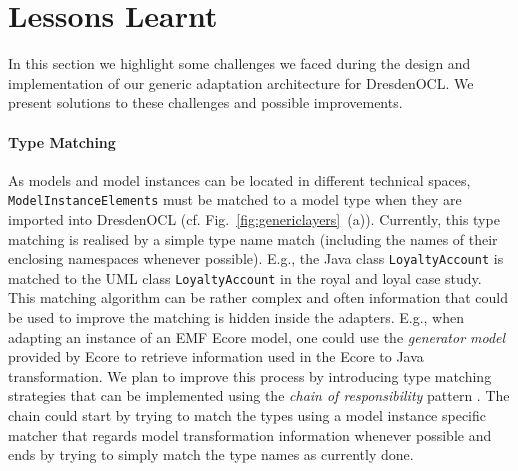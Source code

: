\section{Lessons Learnt}
\label{sec:lessons}

  In this section we highlight some challenges we faced during the design
  and implementation of our generic adaptation architecture for DresdenOCL.
  We present solutions to these challenges and possible improvements.

	\paragraph{Type Matching}
	As models and model instances can be located in different technical spaces,
  \texttt{Model\-Instance\-Elements} must be matched to a model type
	when they are imported into DresdenOCL (cf. Fig.~\ref{fig:genericlayers}~(a)). 
	Currently, this type matching is realised by a simple type name match (including the names of 
	their enclosing namespaces whenever possible). E.g., the Java class \texttt{Loyalty\-Account} is
	matched to the UML class \texttt{Loyalty\-Account} in the royal and loyal case study.
	This matching algorithm can be rather complex and often information that could be 
	used to improve the matching is hidden inside the adapters. E.g., when adapting an instance of an EMF 
	Ecore model, one could use the \emph{generator model} provided by Ecore to
	retrieve information used in the Ecore to Java transformation. We plan to improve this process
  by introducing type matching strategies that 
	can be implemented using the \emph{chain of responsibility} 
	pattern \cite{gamma:dp}. The chain could start by trying to match the 
	types using a model instance specific matcher that regards model transformation information
	whenever possible and ends by trying to 
	simply match the type names as currently done.
	
